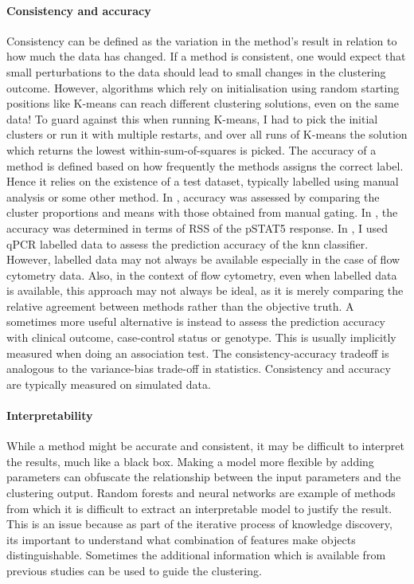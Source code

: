 \paragraph{Consistency and accuracy}
Consistency can be defined as the variation in the method's result in relation to how much the data has changed.
If a method is consistent, one would expect that small perturbations to the data should lead to small changes in the clustering outcome.
However, algorithms which rely on initialisation using random starting positions like K-means can reach different clustering solutions, even on the same data!
To guard against this when running K-means, I had to pick the initial clusters or run it with multiple restarts, and over all runs of K-means the solution which returns the lowest within-sum-of-squares is picked.
The accuracy of a method is defined based on how frequently the methods assigns the correct label.
Hence it relies on the existence of a test dataset, typically labelled using manual analysis or some other method.
In , accuracy was assessed by comparing the cluster proportions and means with those obtained from manual gating.
In , the accuracy was determined in terms of RSS of the pSTAT5 response.
In , I used qPCR labelled data to assess the prediction accuracy of the \gls{knn} classifier.
However, labelled data may not always be available especially in the case of flow cytometry data.
Also, in the context of flow cytometry, even when labelled data is available, this approach may not always be ideal,
as it is merely comparing the relative agreement between methods rather than the objective truth.
A sometimes more useful alternative is instead to assess the prediction accuracy with clinical outcome, case-control status or genotype.
This is usually implicitly measured when doing an association test.
The consistency-accuracy tradeoff is analogous to the variance-bias trade-off in statistics.
Consistency and accuracy are typically measured on simulated data.

\paragraph{Interpretability}
While a method might be accurate and consistent, it may be difficult to interpret the results, much like a black box.
Making a model more flexible by adding parameters can obfuscate the relationship between the input parameters and the clustering output.
Random forests and neural networks are example of methods from which it is difficult to extract an interpretable model to justify the result.
This is an issue because
as part of the iterative process of knowledge discovery, its important to understand what combination of features make objects distinguishable.
Sometimes the additional information which is available from previous studies can be used to guide the clustering.


